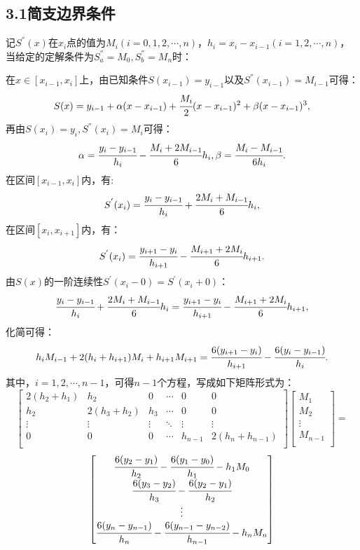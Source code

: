 \documentclass[12pt]{article}
\begin{document}
\subsection*{{\normalsize 3.1}\quad\normalsize\heiti 简支边界条件}
记$S^{''}(x)$在$x_{i}$点的值为$M_{i}(i=0,1,2,\cdots,n)$，$h_{i}=x_{i}-x_{i-1}(i=1,2,\cdots,n)$，当给定的定解条件为$S^{''}_{a}=M_0,S^{''}_{b}=M_n$时：
\par 在$x\in{[x_{i-1},x_{i}]}$上，由已知条件$S(x_{i-1})=y_{i-1}$以及$S^{''}(x_{i-1})=M_{i-1}$可得：
$$S(x)=y_{i-1}+\alpha(x-x_{i-1})+\cfrac{M_{i}}{2}(x-x_{i-1})^{2}+\beta(x-x_{i-1})^{3},$$
再由$S(x_{i})=y_{i},S^{''}(x_{i})=M_{i}$可得：
$$\alpha=\cfrac{y_{i}-y_{i-1}}{h_{i}}-\cfrac{M_{i}+2M_{i-1}}{6}h_{i},\beta=\cfrac{M_{i}-M_{i-1}}{6h_{i}}.$$
在区间$[x_{i-1},x_{i}]$内，有:
$$S^{'}(x_{i})=\cfrac{y_{i}-y_{i-1}}{h_{i}}+\cfrac{2M_{i}+M_{i-1}}{6}h_{i},$$
在区间$[x_{i},x_{i+1}]$内，有：
$$S^{'}(x_{i})=\cfrac{y_{i+1}-y_{i}}{h_{i+1}}-\cfrac{M_{i+1}+2M_{i}}{6}h_{i+1}.$$
由$S(x)$的一阶连续性$S^{'}(x_{i}-0)=S^{'}(x_{i}+0)$：
$$
\cfrac{y_{i}-y_{i-1}}{h_{i}}+\cfrac{2M_{i}+M_{i-1}}{6}h_{i}=\cfrac{y_{i+1}-y_{i}}{h_{i+1}}-\cfrac{M_{i+1}+2M_{i}}{6}h_{i+1},
$$
化简可得：
\begin{equation}\label{4}
h_{i}M_{i-1}+2(h_{i}+h_{i+1})M_{i}+h_{i+1}M_{i+1}=\cfrac{6(y_{i+1}-y_{i})}{h_{i+1}}-\cfrac{6(y_{i}-y_{i-1})}{h_{i}}.
\end{equation}
其中，$i=1,2,\cdots,n-1$，可得$n-1$个方程，写成如下矩阵形式为：
$$
\left[ \begin{matrix}
2(h_{2}+h_{1}) & h_{2} & 0 & \cdots & 0 & 0\\
h_{2} & 2(h_{3}+h_{2}) & h_{3} & \cdots & 0 & 0\\
\vdots & \vdots & \vdots & \ddots &\vdots &\vdots\\
0 & 0 & 0 &\cdots & h_{n-1} & 2(h_{n}+h_{n-1})\\
\end{matrix} \right]
\left[ \begin{matrix}
M_{1} \\
M_{2} \\
\vdots \\
M_{n-1} \\
\end{matrix} \right]
=$$
\begin{equation}\label{5}
\left[ \begin{matrix}
\cfrac{6(y_{2}-y_{1})}{h_{2}}-\cfrac{6(y_{1}-y_{0})}{h_{1}}-h_{1}M_{0}\\
\cfrac{6(y_{3}-y_{2})}{h_{3}}-\cfrac{6(y_{2}-y_{1})}{h_{2}}\\
\vdots\\
\cfrac{6(y_{n}-y_{n-1})}{h_{n}}-\cfrac{6(y_{n-1}-y_{n-2})}{h_{n-1}}-h_{n}M_{n}\\
\end{matrix} \right]
\end{equation}
\end{document}
